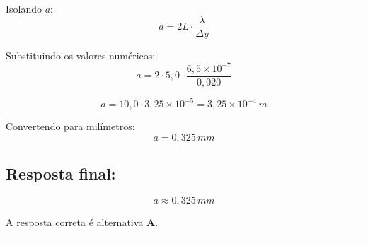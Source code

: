 \documentclass[a4paper,12pt]{article}
\begin{document}
\begin{flushleft}
Isolando \(a\):
\[
a = 2L \cdot \frac{\lambda}{\Delta y}
\]

Substituindo os valores numéricos:
\[
a = 2 \cdot 5{,}0 \cdot \frac{6{,}5 \times 10^{-7}}{0{,}020}
\]

\[
a = 10{,}0 \cdot 3{,}25 \times 10^{-5} = 3{,}25 \times 10^{-4}\,m
\]

Convertendo para milímetros:
\[
a = 0{,}325\,mm
\]

\vspace{0.5cm}

\subsection*{Resposta final:}

\[
\boxed{a \approx 0{,}325\,mm}
\]

A resposta correta é alternativa \colorbox{green!50}{\textbf{A}}.
\end{flushleft}

\noindent\rule{\linewidth}{0.6pt}\\
\end{document}
